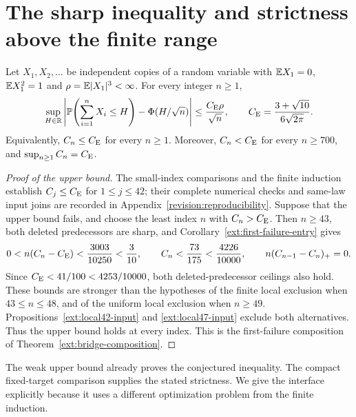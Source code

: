 \clearpage
\section{The sharp inequality and strictness above the finite range}
\label{short:composition}

\begin{theorem}
\label{short:global}
Let $X_1,X_2,\ldots$ be independent copies of a random variable with
$\mathbb E X_1=0$, $\mathbb E X_1^2=1$ and $\rho=\mathbb E|X_1|^3<\infty$.
For every integer $n\ge1$,
\[
 \sup_{H\in\mathbb R}\left|
 \mathbb P\!\left(\sum_{i=1}^nX_i\le H\right)-\Phi(H/\sqrt n)
 \right|\le\frac{C_{\mathrm E}\rho}{\sqrt n},
 \qquad C_{\mathrm E}=\frac{3+\sqrt{10}}{6\sqrt{2\pi}}.
\]
Equivalently, $C_n\le C_{\mathrm E}$ for every $n\ge1$. Moreover,
$C_n<C_{\mathrm E}$ for every $n\ge700$, and $\sup_{n\ge1}C_n=C_{\mathrm E}$.
\end{theorem}

\begin{proof}[Proof of the upper bound]
The small-index comparisons and the finite induction establish
$C_j\le C_{\mathrm E}$ for $1\le j\le42$; their complete numerical checks
and same-law input joins are recorded in
Appendix~\ref{revision:reproducibility}. Suppose that the upper bound
fails, and choose the least index $n$ with $C_n>C_{\mathrm E}$.
Then $n\ge43$, both deleted predecessors are sharp, and
Corollary~\ref{ext:first-failure-entry} gives
\[
 0<n(C_n-C_{\mathrm E})<\frac{3003}{10250}<\frac3{10},\qquad
 C_n<\frac{73}{175}<\frac{4226}{10000},\qquad
 n(C_{n-1}-C_n)_+=0.
\]
Since $C_{\mathrm E}<41/100<4253/10000$, both deleted-predecessor ceilings
also hold. These bounds are stronger than the hypotheses of the finite local exclusion
when $43\le n\le48$, and of the uniform local exclusion when
$n\ge49$. Propositions~\ref{ext:local42-input} and
\ref{ext:local47-input} exclude both alternatives. Thus the upper
bound holds at every index. This is the first-failure composition
of Theorem~\ref{ext:bridge-composition}.
\end{proof}

The weak upper bound already proves the conjectured inequality.
The compact fixed-target comparison supplies the stated strictness.
We give the interface explicitly because it uses a different
optimization problem from the finite induction.

